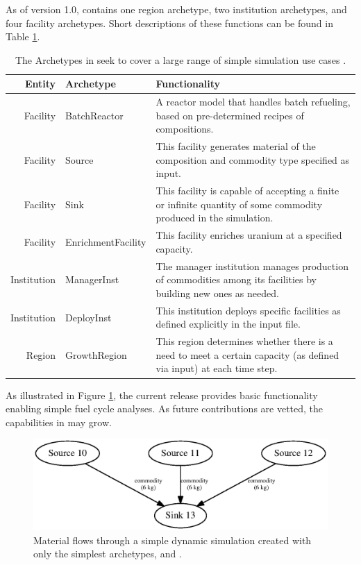 As of version 1.0, \Cycamore contains one region archetype, two institution
archetypes, and four facility archetypes. Short descriptions of these functions
can be found in Table \ref{tab:cycamore}.


\begin{table}[h]
\centering
\begin{tabularx}{\textwidth}{|r|l|X|}
\hline
\textbf{Entity} & \textbf{Archetype} & \textbf{Functionality} \\
\hline
Facility & BatchReactor & A reactor model that handles batch refueling, based on pre-determined recipes of compositions. \\
Facility & Source & This facility generates material of the composition and commodity type specified as input.  \\
Facility & Sink & This facility is capable of accepting a finite or infinite quantity of some commodity produced in the simulation. \\
Facility & EnrichmentFacility & This facility enriches uranium at a specified capacity. \\
Institution & ManagerInst & The manager institution manages production of commodities among its facilities by building new ones as needed. \\
Institution & DeployInst &  This institution deploys specific facilities as defined explicitly in the input file. \\
Region & GrowthRegion & This region determines whether there is a need to meet a certain capacity (as defined via input) at each time step. \\
\hline
\end{tabularx}
\caption{The Archetypes in \Cycamore seek to cover a large range of simple simulation use cases \cite{carlsen_cycamore_2014}.}
\label{tab:cycamore}
\end{table}

As illustrated in
Figure \ref{fig:simplesim}, the current \Cycamore release provides basic
functionality enabling simple fuel cycle analyses. As future contributions are
vetted, the capabilities in \Cycamore may grow.

\begin{figure}[htbp!]
\begin{center}
\includegraphics{./images/simplesim}
\end{center}
\caption{Material flows through a simple dynamic simulation created with only the simplest \Cycamore archetypes,  and .}
\label{fig:simplesim}
\end{figure}

